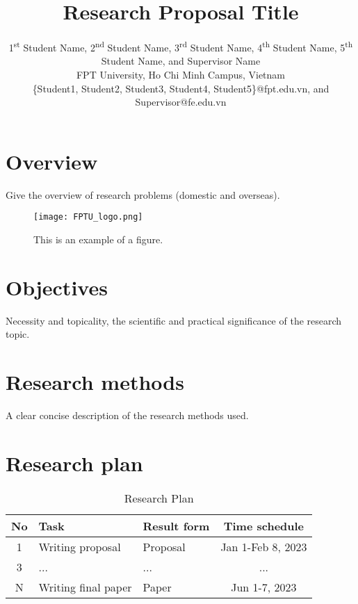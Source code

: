 \documentclass[conference, onecolumn]{IEEEtran}
\begin{document}
\title{Research Proposal Title\\
}

\author{
1\textsuperscript{st} Student Name, 2\textsuperscript{nd} Student Name, 3\textsuperscript{rd} Student Name, 4\textsuperscript{th} Student Name, 5\textsuperscript{th} Student Name, and Supervisor Name\\
FPT University, Ho Chi Minh Campus, Vietnam\\
\{Student1, Student2, Student3, Student4, Student5\}@fpt.edu.vn, and Supervisor@fe.edu.vn}
\maketitle

\section{Overview}
Give the overview of research problems (domestic and overseas).

\begin{figure}[htbp]
\centerline{\texttt{[image: FPTU\_logo.png]}}
\caption{This is an example of a figure.}
\label{fig}
\end{figure}

\section{Objectives}
Necessity and topicality, the scientific and practical significance of the research topic.\\

\section{Research methods}
A clear concise description of the research methods used.\\

\section{Research plan}
\begin{table}[htbp]
\caption{Research Plan}
\begin{center}
\begin{tabular}{|c|l|l|c|}
\hline
\textbf{No}&\textbf{Task} & \textbf{Result form}& \textbf{Time schedule} \\
\hline
1 & Writing proposal & Proposal & Jan 1-Feb 8, 2023 \\
\hline
3 & ...&... & ... \\
\hline
N & Writing final paper & Paper & Jun 1-7, 2023 \\
\hline
\end{tabular}
\label{tab1}
\end{center}
\end{table}
\end{document}
